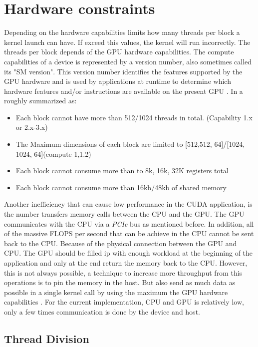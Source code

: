 \section{Hardware constraints}

Depending on the hardware capabilities limits how many threads per block a kernel launch can have. If exceed this values, the kernel will run incorrectly. The threads per block depends of the GPU hardware capabilities. The compute capabilities of a device is represented by a version number, also sometimes called its "SM version". This version number identifies the features supported by the GPU hardware and is used by applications at runtime to determine which hardware features and/or instructions are available on the present GPU \cite{tool}. In a roughly summarized as:

\begin{itemize}
\item Each block cannot have more than 512/1024 threads in total. (Capability 1.x or 2.x-3.x)
\item The Maximum dimensions of each block are limited to [512,512, 64]/[1024, 1024, 64](compute 1,1.2)
\item Each block cannot consume more than to 8k, 16k, 32K registers total
\item Each block cannot consume more than 16kb/48kb of shared memory
\end{itemize}

Another inefficiency that can cause low performance in the CUDA application, is the number transfers memory calls between the CPU and the GPU. The GPU communicates with the CPU via a \textit{PCIe} bus as mentioned before. In addition, all of the massive FLOPS per second that can be achieve in the CPU cannot be sent back to the CPU. Because of the physical connection between the GPU and CPU. The GPU should be filled ip with enough workload at the beginning of the application and only at the end  return the memory back to the CPU. However, this is not always possible, a technique to increase more throughput from this operations is to pin the memory in the host. But also send as much data as possible in a single kernel call by using the maximum the GPU hardware capabilities \cite{practices}. For the current implementation, CPU and GPU is relatively low, only a few times communication is done by the device and host.

\subsection{Thread Division}

